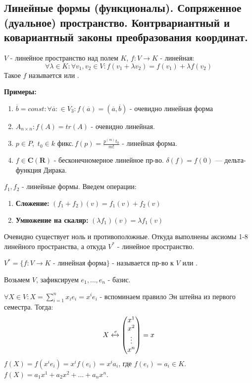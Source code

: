 \subsection{Линейные формы (функционалы). Сопряженное (дуальное) пространство. Контрвариантный и ковариантный законы преобразования координат.}

 $V$ - линейное пространство над полем $K$, $f:V \rightarrow  K$ - линейная:
$$\forall \lambda \in K: \forall  v_1,v_2 \in V: f(v_1+ \lambda v_2) = f(v_1)+ \lambda f(v_2)$$
Такое $f$ называется  или .

\textbf{Примеры:}

\begin{enumerate}
    \item $\overline{b} = const: \forall \overline{a}: \in V_3: f(\overline{a}) = (\overline{a},\overline{b})$ - очевидно линейная форма
    \item $A_{n\times n}: f(A) = tr (A)$ - очевидно линейная.
    \item $p \in P$, $\, t_0 \in k \text{ фикс.} \, f(p)= \frac{p^{(m)}t_0}{m!}$ - линейная форма.
    \item $f\in \mathbf{C}(\mathbf{R})$ - бесконечномерное линейное пр-во. $\delta(f)=f(0)$ --- дельта-функция Дирака.
\end{enumerate}

$f_1, f_2$ - линейные формы. Введем операции:
\begin{enumerate}
    \item \textbf{Сложение:} $(f_1+f_2)(v) = f_1(v) + f_2(v)$
    \item \textbf{Умножение на скаляр:}  $(\lambda f_1) (v) = \lambda f_1(v)$
\end{enumerate}
Очевидно существует ноль и противоположные. Откуда выполнены аксиомы 1-8 линейного пространства, а откуда $V^*$ - линейное пространство.

$V^* = \{f: V \rightarrow K \text{ - линейная форма}\}$ - называется  пр-во к $V$ или .

Возьмем $V$, зафиксируем  $e_1,\ldots,e_n$ - базис.

$\forall X \in V: X = \sum\limits_{i=1}^nx_i e_i = x^ie_i$ - вспоминаем правило Эн  штейна из первого семестра. Тогда:
$$X \xleftrightarrow{e}\begin{pmatrix}
    x^1 \\
    x^2 \\
    \vdots \\
    x^n
\end{pmatrix} =x$$
$f(X) = f(x^ie_i) = x^if(e_i) = x^ia_i$, где $f(e_i) = a_i \in K$. $f(X) = a_1x^1+a_2x^2 + \ldots + a_n x^n$.

